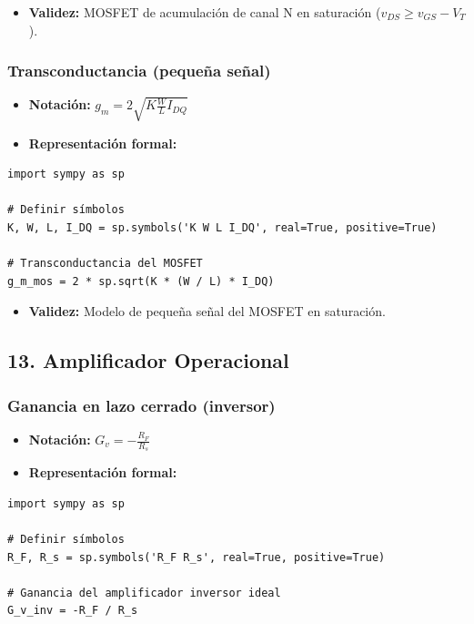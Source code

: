 \documentclass[11pt,a4paper]{article}
\begin{document}
\begin{itemize}[leftmargin=*,topsep=2pt,itemsep=1pt]
  \item \textbf{Validez:} MOSFET de acumulación de canal N en saturación ($v_{DS} \ge v_{GS} - V_T$).
\end{itemize}


\subsubsection*{Transconductancia (pequeña señal)}


\begin{itemize}[leftmargin=*,topsep=2pt,itemsep=1pt]
  \item \textbf{Notación:} $g_m = 2 \sqrt{K \frac{W}{L} I_{DQ}}$
  \item \textbf{Representación formal:}
\end{itemize}


\begin{lstlisting}
import sympy as sp

# Definir símbolos
K, W, L, I_DQ = sp.symbols('K W L I_DQ', real=True, positive=True)

# Transconductancia del MOSFET
g_m_mos = 2 * sp.sqrt(K * (W / L) * I_DQ)
\end{lstlisting}


\begin{itemize}[leftmargin=*,topsep=2pt,itemsep=1pt]
  \item \textbf{Validez:} Modelo de pequeña señal del MOSFET en saturación.
\end{itemize}


\subsection*{13. Amplificador Operacional}


\subsubsection*{Ganancia en lazo cerrado (inversor)}


\begin{itemize}[leftmargin=*,topsep=2pt,itemsep=1pt]
  \item \textbf{Notación:} $G_v = -\frac{R_F}{R_s}$
  \item \textbf{Representación formal:}
\end{itemize}


\begin{lstlisting}
import sympy as sp

# Definir símbolos
R_F, R_s = sp.symbols('R_F R_s', real=True, positive=True)

# Ganancia del amplificador inversor ideal
G_v_inv = -R_F / R_s
\end{lstlisting}
\end{document}
